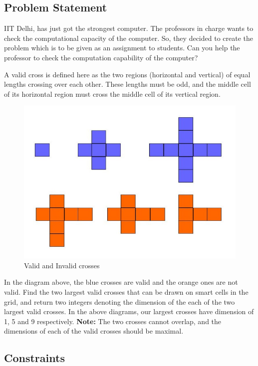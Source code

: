 \documentclass[12pt]{article}
\begin{document}
	
		\subsection{Problem Statement}
		IIT Delhi, has just got the strongest computer. The professors in charge wants to check the
		computational capacity of the computer. So, they decided to create the problem which is to
		be given as an assignment to students. Can you help the professor to check the computation
		capability of the computer?
		
		A valid cross is defined here as the two regions (horizontal and vertical) of equal lengths
		crossing over each other. These lengths must be odd, and the middle cell of its horizontal
		region must cross the middle cell of its vertical region.
		
		
		\begin{figure}[h!]
			\centering
			\caption{Valid and Invalid crosses}
			\includegraphics[scale=.5]{ps1_p_1.jpg}
		\end{figure}
		
		In the diagram above, the blue crosses are valid and the orange ones are not valid.
		Find the two largest valid crosses that can be drawn on smart cells in the grid, and return
		two integers denoting the dimension of the each of the two largest valid crosses. In the
		above diagrams, our largest crosses have dimension of 1, 5 and 9 respectively.
		\textbf{Note:} The two crosses cannot overlap, and the dimensions of each of the valid crosses
		should be maximal.	
		\subsection{Constraints}
		
\end{document}
